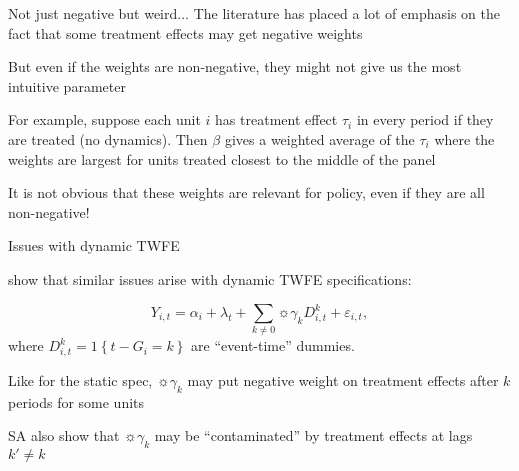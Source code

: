 \documentclass[aspectratio = 169, 13pt]{beamer}
\begin{document}
\begin{frame}{Not just negative but weird...}
  The literature has placed a lot of emphasis on the fact that some treatment effects may get negative weights
  \begin{wideitemize}
    \item
    But even if the weights are non-negative, they might not give us the most intuitive parameter

    \item
    For example, suppose each unit $i$ has treatment effect $\tau_i$ in every period if they are treated (no dynamics). Then $\beta$ gives a weighted average of the $\tau_i$ where the weights are largest for units treated closest to the middle of the panel

    \item
    It is not obvious that these weights are relevant for policy, even if they are all non-negative!
  \end{wideitemize}
\end{frame}

\begin{frame}{Issues with dynamic TWFE}
  \begin{wideitemize}
    \item
    \citet{sun_estimating_2020} show that similar issues arise with dynamic TWFE specifications:

    \begin{equation*}
      Y_{i,t} = \alpha_i + \lambda_t +  \sum_{k \neq 0} \sun{ \gamma_k D_{i,t}^{k}} + \varepsilon_{i,t},
    \end{equation*}
    where $D_{i,t}^{k} = 1\left\{t-G_{i}=k\right\}$ are ``event-time'' dummies.

    \item
    Like for the static spec, $\sun{\gamma_k}$ may put negative weight on treatment effects after $k$ periods for some units

    \item
    SA also show that $\sun{\gamma_k}$ may be ``contaminated'' by treatment effects at lags $k' \neq k$


  \end{wideitemize}

\end{frame}
\end{document}
